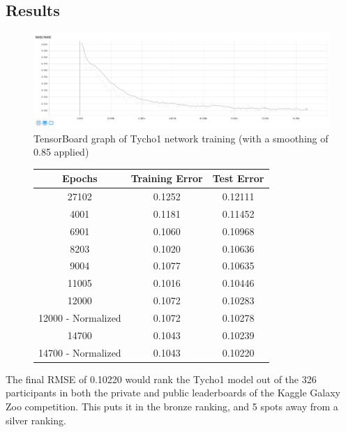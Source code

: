 \documentclass[12pt,a4paper,oneside,oldfontcommands]{memoir}
\begin{document}
\begin{Declaration Of OriginalityOrginality}
\section{Results}

\begin{figure}[H]
  \centering
    \includegraphics[width=\linewidth]{graphs/B/tycho_1_TRAIN_SELECT_ONE_ADAM_0004_sigmoid.png}
    \caption{TensorBoard graph of Tycho1 network training (with a smoothing of 0.85 applied)}
   \label{fig:tycho1-tb}
\end{figure}

\begin{figure}
\begin{center}
 \begin{tabular}{||c | c | c||} 
 \hline
 Epochs & Training Error & Test Error \\ [0.5ex] 
 \hline\hline
 27102 & 0.1252 & 0.12111\\ 
 \hline
 4001 & 0.1181 & 0.11452\\
 \hline
 6901 & 0.1060 & 0.10968\\
 \hline
 8203 & 0.1020 & 0.10636\\
 \hline
 9004 & 0.1077 & 0.10635\\ 
 \hline
 11005 & 0.1016 & 0.10446\\ 
 \hline
 12000 & 0.1072 & 0.10283\\ 
 \hline
 12000 - Normalized & 0.1072 & 0.10278\\
 \hline
 14700 & 0.1043 & 0.10239\\ 
 \hline
 14700 - Normalized & 0.1043 & 0.10220\\ [1ex] 
 \hline
\end{tabular}
\end{center}
\end{figure}

The final RMSE of 0.10220 would rank the Tycho1 model  out of the 326 participants in both the private and public leaderboards of the Kaggle Galaxy Zoo competition. This puts it in the bronze ranking, and 5 spots away from a silver ranking. 


\end{Declaration Of OriginalityOrginality}
\end{document}
